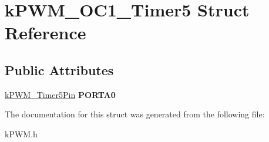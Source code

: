 \hypertarget{structkPWM__OC1__Timer5}{}\section{k\+P\+W\+M\+\_\+\+O\+C1\+\_\+\+Timer5 Struct Reference}
\label{structkPWM__OC1__Timer5}
\subsection*{Public Attributes}
\begin{DoxyCompactItemize}
\item 
\hyperlink{structkPWM__Timer5Pin}{k\+P\+W\+M\+\_\+\+Timer5\+Pin} {\bfseries P\+O\+R\+T\+A0}\hypertarget{structkPWM__OC1__Timer5_aa13530c61dcc9b88cc0c3eb198fb8366}{}\label{structkPWM__OC1__Timer5_aa13530c61dcc9b88cc0c3eb198fb8366}

\end{DoxyCompactItemize}


The documentation for this struct was generated from the following file\+:\begin{DoxyCompactItemize}
\item 
k\+P\+W\+M.\+h\end{DoxyCompactItemize}
